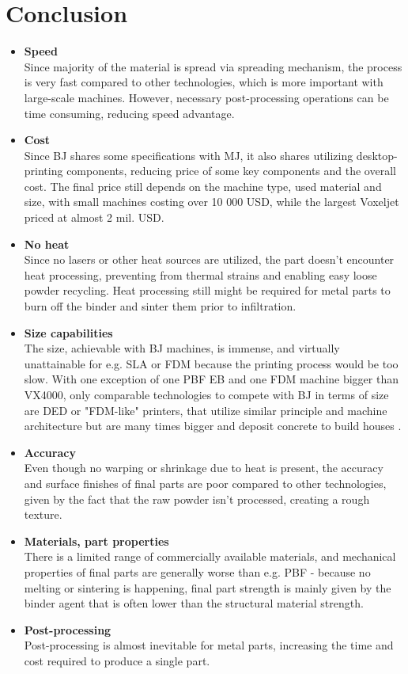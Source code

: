 \documentclass[a4paper, 11pt, reqno]{report}
\newcommand\pro{\item[$+$]}
\newcommand\con{\item[$-$]}
\begin{document}
\section{Conclusion}
\begin{itemize}

\pro \textbf{Speed}\\
Since majority of the material is spread via spreading mechanism, the process is very fast compared to other technologies, which is more important with large-scale machines. However, necessary post-processing operations can be time consuming, reducing speed advantage.

\pro \textbf{Cost}\\
Since BJ shares some specifications with MJ, it also shares utilizing desktop-printing components, reducing price of some key components and the overall cost. The final price still depends on the machine type, used material and size, with small machines costing over 10 000 USD, while the largest Voxeljet priced at almost 2 mil. USD.

\pro \textbf{No heat}\\
Since no lasers or other heat sources are utilized, the part doesn't encounter heat processing, preventing from thermal strains and enabling easy loose powder recycling. Heat processing still might be required for metal parts to burn off the binder and sinter them prior to infiltration.

\pro \textbf{Size capabilities}\\
The size, achievable with BJ machines, is immense, and virtually unattainable for e.g. SLA or FDM because the printing process would be too slow. With one exception of one PBF EB and one FDM machine bigger than VX4000, only comparable technologies to compete with BJ in terms of size are DED or "FDM-like" printers, that utilize similar principle and machine architecture but are many times bigger and deposit concrete to build houses \cite{BigPrinters}.
\\[10pt]

\con \textbf{Accuracy}\\
Even though no warping or shrinkage due to heat is present, the accuracy and surface finishes of final parts are poor compared to other  technologies, given by the fact that the raw powder isn't processed, creating a rough texture.

\con \textbf{Materials, part properties}\\
There is a limited range of commercially available materials, and mechanical properties of final parts are generally worse than e.g. PBF - because no melting or sintering is happening, final part strength is mainly given by the binder agent that is often lower than the structural material strength.

\con \textbf{Post-processing}\\
Post-processing is almost inevitable for metal parts, increasing the time and cost required to produce a single part.
\end{itemize}
\end{document}

